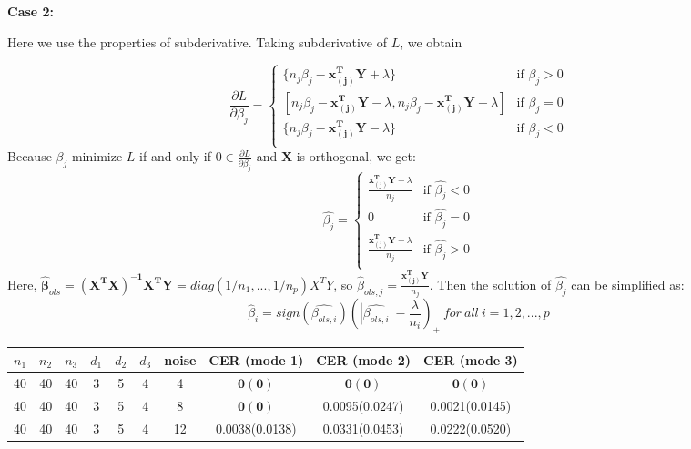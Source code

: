 \documentclass{article}
\begin{document}
\begin{appendices}
\textbf{Case 2:}\par
Here we use the properties of subderivative. Taking subderivative of $L$, we obtain
	
\begin{equation*}
\frac{\partial L}{\partial \beta_j} = 
\begin{cases}
\{n_j\beta_j-\mathbf{x_{(j)}^TY}+\lambda\} &\mbox{if $\beta_j>0$}\\
 [n_j\beta_j-\mathbf{x_{(j)}^TY}-\lambda, n_j\beta_j-\mathbf{x_{(j)}^TY}+\lambda]&\mbox{if $\beta_j=0$}\\
\{n_j\beta_j-\mathbf{x_{(j)}^TY}-\lambda\} &\mbox{if $\beta_j<0$}\\
\end{cases}
\end{equation*}
Because $\beta_j$ minimize $L$ if and only if $0 \in \frac{\partial L}{\partial \beta_j}$ and  $\mathbf{X}$ is orthogonal, we get:
\begin{equation*}
\hat{\beta_j} = 
\begin{cases}
\frac{\mathbf{x_{(j)}^TY}+\lambda}{n_j}&\mbox{if $\hat{\beta_j}<0$}\\
0 &\mbox{if $\hat{\beta_j}=0$}\\
\frac{\mathbf{x_{(j)}^TY}-\lambda}{n_j}&\mbox{if $\hat{\beta_j}>0$}\\
\end{cases}
\end{equation*}
Here, $\bm{\hat{\beta}}_{ols} = \mathbf{(X^TX)^{-1}X^TY} = diag(1/n_1, ..., 1/n_p)X^TY$, so $\hat{\beta}_{ols,j}=\frac{\mathbf{x_{(j)}^TY}}{n_j}$. Then the solution of $\hat{\beta_j}$ can be simplified as:
\begin{equation*}
	\hat{\beta}_i = sign(\hat{\beta_{ols,i}})(|\hat{\beta_{ols,i}}|-\frac{\lambda}{n_i})_+\ for\ all\ i=1,2,...,p
\end{equation*}



\begin{table}[http]
	\centering
	\begin{tabular}{|c|c|c|c|c|c|c|c|c|c|}
		\hline
		$n_1$&$n_2$&$n_3$&$d_1$&$d_2$&$d_3$&noise&CER (mode 1)&CER (mode 2)&CER (mode 3)\\ \hline
		40&40&40&3&5&4&4&
		$\mathbf{0(0)}$&$\mathbf{0(0)}$&$\mathbf{0(0)}$\\
		40&40&40&3&5&4&8&$\mathbf{0(0)}$&0.0095(0.0247)&0.0021(0.0145) \\
		40&40&40&3&5&4&12&0.0038(0.0138)&0.0331(0.0453)&0.0222(0.0520)\\


\end{tabular}
\end{table}
\end{appendices}
\end{document}
